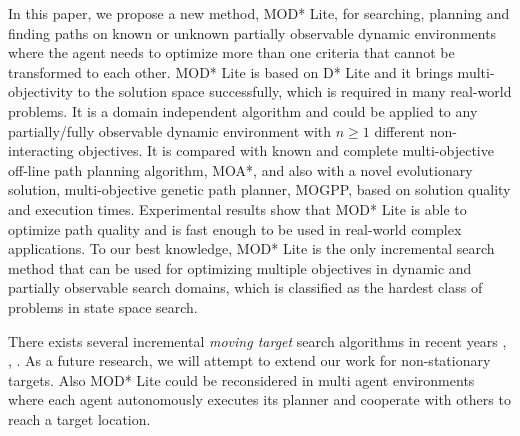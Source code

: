 \documentclass[10pt,journal]{IEEEtran}
\begin{document}
In this paper, we propose a new method, MOD* Lite, for searching, planning and finding paths on known or unknown partially observable dynamic environments  where the agent needs to optimize more than one criteria that cannot be transformed to each other.  MOD* Lite is based on D* Lite and it brings multi-objectivity to the solution space successfully, which is required in many real-world problems. It is a domain independent algorithm and could be applied to any partially/fully observable dynamic environment with $n \ge 1$ different non-interacting objectives. It is compared with known and complete multi-objective off-line path planning algorithm, MOA*, and also with a novel evolutionary solution, multi-objective genetic path planner, MOGPP, based on solution quality and execution times. Experimental results show that MOD* Lite is able to optimize path quality and is fast enough to be used in real-world complex applications. To our best knowledge, MOD* Lite is the only incremental search method that can be used for optimizing multiple objectives in dynamic and partially observable search domains, which is classified as the hardest class of problems in state space search.

There exists several incremental {\it moving target} search algorithms in recent years \cite{Sun:2009}, \cite{GFR-A*Sun:2010}, \cite{MT-D*Lite:2010}. As a future research, we will attempt to extend our work for non-stationary targets. Also MOD* Lite could be reconsidered in multi agent environments where each agent autonomously executes its planner and cooperate with others to reach a target location. 

{}

\end{document}

